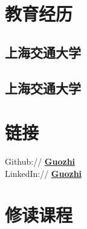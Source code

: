 \documentclass[]{deedy-resume-openfont}
\begin{document}
%
%
\lastupdated

%
%

%
%

\begin{minipage}[t]{0.25\textwidth} 


\section{教育经历} 
\sectionsep

\subsection{上海交通大学}
\sectionsep

\subsection{上海交通大学}
\sectionsep


\section{链接}
\sectionsep  
Github:// \href{https://github.com/Guozhi-explore}{\bf Guozhi} \\
LinkedIn://  \href{https://www.linkedin.com/in/zhi-guo-316892186}{\bf Guozhi} \\


\section{修读课程}

\end{minipage}
\end{document}
